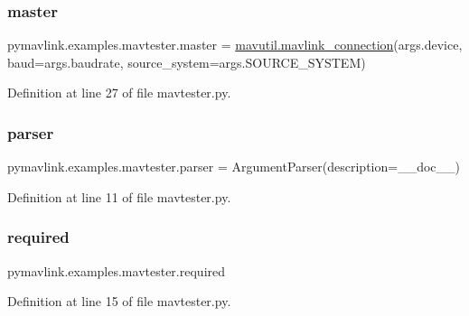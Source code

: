 \subsubsection{\texorpdfstring{master}{master}}
{\footnotesize\ttfamily pymavlink.\+examples.\+mavtester.\+master = \mbox{\hyperlink{namespacepymavlink_1_1mavutil_aa6c4b8861f86ef3bb746fa0fab241c93}{mavutil.\+mavlink\+\_\+connection}}(args.\+device, baud=args.\+baudrate, source\+\_\+system=args.\+S\+O\+U\+R\+C\+E\+\_\+\+S\+Y\+S\+T\+EM)}



Definition at line 27 of file mavtester.\+py.

\mbox{\label{namespacepymavlink_1_1examples_1_1mavtester_abaf020d3f161e1f0172b14362f3d36f5}} 
\subsubsection{\texorpdfstring{parser}{parser}}
{\footnotesize\ttfamily pymavlink.\+examples.\+mavtester.\+parser = Argument\+Parser(description=\+\_\+\+\_\+doc\+\_\+\+\_\+)}



Definition at line 11 of file mavtester.\+py.

\mbox{\label{namespacepymavlink_1_1examples_1_1mavtester_a8816d6500a50df4c5fc9a43197b27bc9}} 
\subsubsection{\texorpdfstring{required}{required}}
{\footnotesize\ttfamily pymavlink.\+examples.\+mavtester.\+required}



Definition at line 15 of file mavtester.\+py.

\mbox{\label{namespacepymavlink_1_1examples_1_1mavtester_af775e6d2c46f681aea052a01b4c1ccd1}} 

